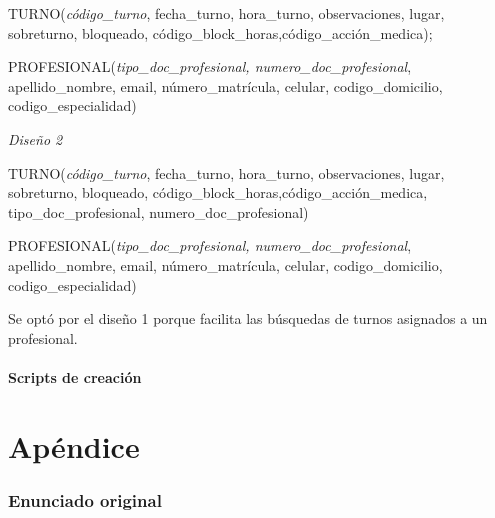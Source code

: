 \documentclass[a4paper,11pt]{article}
\begin{document}
TURNO(\emph{código\_turno}, fecha\_turno, hora\_turno, observaciones, lugar, sobreturno, 
bloqueado, código\_block\_horas,código\_acción\_medica);

PROFESIONAL(\emph{tipo\_doc\_profesional, numero\_doc\_profesional}, apellido\_nombre, 
email, número\_matrícula, celular,\textit{\textbf{ }}codigo\_domicilio, codigo\_especialidad)

\textit{Diseño 2}

TURNO(\emph{código\_turno}, fecha\_turno, hora\_turno, observaciones, lugar, sobreturno, 
bloqueado, código\_block\_horas,código\_acción\_medica, tipo\_doc\_profesional, 
numero\_doc\_profesional)

PROFESIONAL(\emph{tipo\_doc\_profesional, numero\_doc\_profesional}, apellido\_nombre, 
email, número\_matrícula, celular,\textit{\textbf{ }}codigo\_domicilio, codigo\_especialidad)

Se optó por el diseño 1 porque facilita las búsquedas de turnos asignados a 
un profesional.\pagebreak{}\label{HToc293405855}

\newpage

\subsection{Scripts de creación}




\clearpage

\part{Apéndice}
\appendix

\section{Enunciado original}\label{sec:enunciado}

\end{document}
